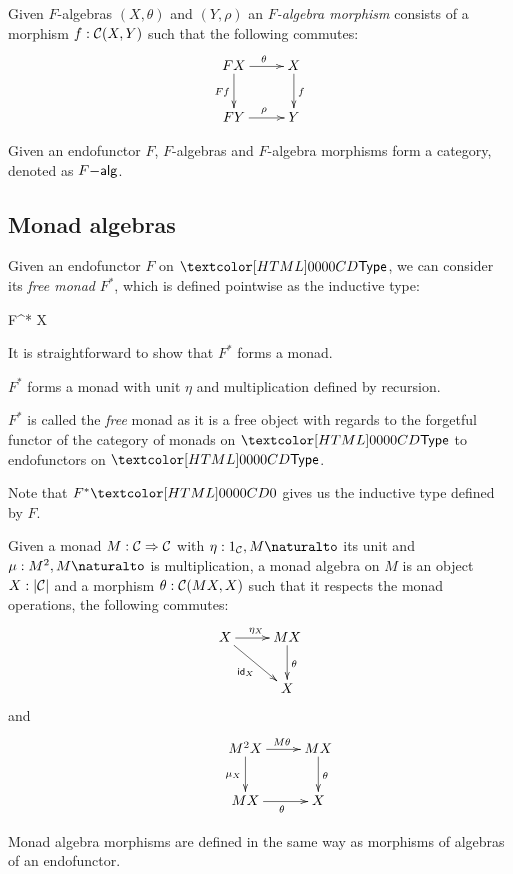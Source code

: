 \begin{definition}
  Given $F$-algebras $(X,\theta)$ and $(Y,\rho)$ an \emph{$F$-algebra
    morphism} consists of a morphism $f : \mathcal{C}(X,Y)$ such that the
  following commutes:
  $$
  \xymatrix{
    FX \ar[r]^{\theta} \ar[d]_{Ff} &X \ar[d]^{f} \\
    FY \ar[r]^{\rho} &Y
  }
  $$
\end{definition}

\begin{proposition}
  Given an endofunctor $F$, $F$-algebras and $F$-algebra morphisms
  form a category, denoted as $F\mathsf{-alg}$.
\end{proposition}

\subsection{Monad algebras}

Given an endofunctor $F$ on $\Type$, we can consider its \emph{free
  monad} $F^*$, which is defined pointwise as the inductive type:

\begin{datatype}{F^* X}{\Type}
   \\
\end{datatype}

It is straightforward to show that $F^*$ forms a monad.

\begin{proposition}
  $F^*$ forms a monad with unit $\eta$ and multiplication defined by
  recursion.
\end{proposition}

$F^*$ is called the \emph{free} monad as it is a free object with
regards to the forgetful functor of the category of monads on $\Type$
to endofunctors on $\Type$.

Note that $F^* \emptyty$ gives us the inductive type defined by $F$.

\begin{definition}
  Given a monad $M : \mathcal{C} \Rightarrow \mathcal{C}$ with $\eta : \Nat{1_{\Cc},M}$
  its unit and $\mu : \Nat{M^2,M}$ is multiplication, a monad algebra
  on $M$ is an object $X : | \mathcal{C} |$ and a morphism
  $\theta : \mathcal{C}(MX,X)$ such that it respects the monad operations, \ie
  the following commutes:
  $$
  \xymatrix{
    X \ar[r]^{\eta_X} \ar[dr]_{\id_X} &MX \ar[d]^{\theta} \\
    &X
  }
  $$
  and
  $$
  \xymatrix{
    &M^2 X \ar[r]^{M \theta} \ar[d]_{\mu_X} &MX \ar[d]^{\theta} \\
    &MX \ar[r]_{\theta} &X
  }
  $$

  Monad algebra morphisms are defined in the same way as morphisms of
  algebras of an endofunctor.
\end{definition}

